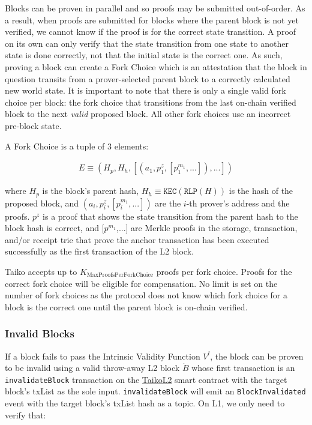 \documentclass[9pt,oneside]{amsart}
\begin{document}
\begin{multicols}{2}
Blocks can be proven in parallel and so proofs may be submitted out-of-order. As a result, when proofs are submitted for blocks where the parent block is not yet verified, we cannot know if the proof is for the correct state transition. A proof on its own can only verify that the state transition from one state to another state is done correctly, not that the initial state is the correct one. As such, proving a block can create a Fork Choice which is an attestation that the block in question transits from a prover-selected parent block to a correctly calculated new world state. It is important to note that there is only a single valid fork choice per block: the fork choice that transitions from the last on-chain verified block to the next \emph{valid} proposed block. All other fork choices use an incorrect pre-block state.

A Fork Choice is a tuple of 3 elements:

\begin{eqnarray}
E \equiv (H_p, H_h, [(a_1, p^{z}_1, [p^{m_1}_1,...]),...])
\end{eqnarray}

where $H_p$ is the block's parent hash, $H_h \equiv \texttt{KEC}(\texttt{RLP}(H))$ is the hash of the proposed block, and $(a_i, p^{z}_i, [p^{m_1}_i,...])$ are the $i$-th prover's address and the proofs. $p^{z}$ is a proof that shows the state transition from the parent hash to the block hash is correct, and [$p^{m_1}$,...] are Merkle proofs in the storage, transaction, and/or receipt trie that prove the anchor transaction has been executed successfully as the first transaction of the L2 block.

Taiko accepts up to $K_{\mathrm{MaxProofsPerForkChoice}}$ proofs per fork choice. Proofs for the correct fork choice will be eligible for compensation. No limit is set on the number of fork choices as the protocol does not know which fork choice for a block is the correct one until the parent block is on-chain verified.

\subsubsection{Invalid Blocks} \label{sec:proving-invalid}

If a block fails to pass the Intrinsic Validity Function $V^l$, the block can be proven to be invalid using a valid throw-away L2 block $\dot{B}$ whose first transaction is an \texttt{invalidateBlock} transaction on the \underline{TaikoL2} smart contract with the target block's txList as the sole input. \texttt{invalidateBlock} will emit an \texttt{BlockInvalidated} event with the target block's txList hash as a topic. On L1, we only need to verify that:


\end{multicols}
\end{document}
